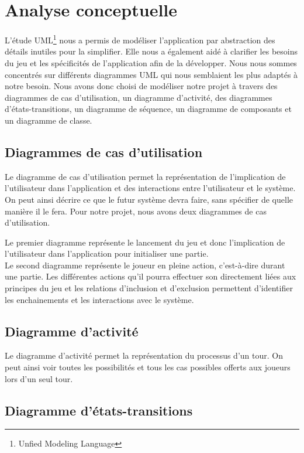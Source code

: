 \chapter{Analyse conceptuelle}

L’étude UML\footnote{Unfied Modeling Language} nous a permis de modéliser l’application par abstraction des détails inutiles pour la simplifier. Elle nous a également aidé à clarifier les besoins du jeu et les spécificités de l’application afin de la développer. Nous nous sommes concentrés sur différents diagrammes UML qui nous semblaient les plus adaptés à notre besoin. Nous avons donc choisi de modéliser notre projet à travers des diagrammes de cas d’utilisation, un diagramme d’activité, des diagrammes d’états-transitions, un diagramme de séquence, un diagramme de composants et un diagramme de classe.

\section{Diagrammes de cas d'utilisation}

Le diagramme de cas d’utilisation permet la représentation de l’implication de l’utilisateur dans l’application et des interactions entre l’utilisateur et le système. On peut ainsi décrire ce que le futur système devra faire, sans spécifier de quelle manière il le fera.
Pour notre projet, nous avons deux diagrammes de cas d’utilisation.

Le premier diagramme représente le lancement du jeu et donc l’implication de l’utilisateur dans l’application pour initialiser une partie.\\

Le second diagramme représente le joueur en pleine action, c'est-à-dire durant une partie. Les différentes actions qu’il pourra effectuer son directement liées aux principes du jeu et les relations d’inclusion et d’exclusion permettent d’identifier les enchainements et les interactions avec le système.

\section{Diagramme d'activité}

Le diagramme d’activité permet la représentation du processus d’un tour. On peut ainsi voir toutes les possibilités et tous les cas possibles offerts aux joueurs lors d’un seul tour.

\section{Diagramme d'états-transitions}

